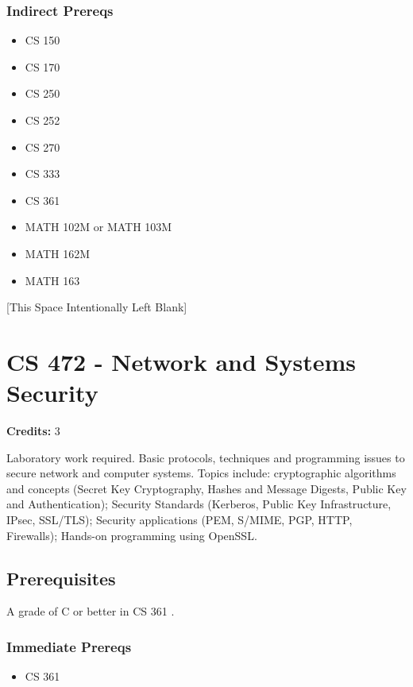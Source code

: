 \documentclass[]{article}
\providecommand{\tightlist}{%
  \setlength{\itemsep}{0pt}\setlength{\parskip}{0pt}}
\newcommand{\pagebreakhere}{
\vspace*{\fill}
\begin{center}
[This Space Intentionally Left Blank]
\end{center}
\vspace*{\fill}
\newpage
}
\begin{document}
\subsubsection{Indirect Prereqs}\label{indirect-prereqs-34}

\begin{itemize}
\tightlist
\item
  CS 150
\item
  CS 170
\item
  CS 250
\item
  CS 252
\item
  CS 270
\item
  CS 333
\item
  CS 361
\item
  MATH 102M or MATH 103M
\item
  MATH 162M
\item
  MATH 163
\end{itemize}

\pagebreakhere
\section{CS 472 - Network and Systems
Security}\label{cs-472---network-and-systems-security}

\textbf{Credits:} 3

Laboratory work required. Basic protocols, techniques and programming
issues to secure network and computer systems. Topics include:
cryptographic algorithms and concepts (Secret Key Cryptography, Hashes
and Message Digests, Public Key and Authentication); Security Standards
(Kerberos, Public Key Infrastructure, IPsec, SSL/TLS); Security
applications (PEM, S/MIME, PGP, HTTP, Firewalls); Hands-on programming
using OpenSSL.

\subsection{Prerequisites}\label{prerequisites-44}

A grade of C or better in CS 361 .

\subsubsection{Immediate Prereqs}\label{immediate-prereqs-35}

\begin{itemize}
\tightlist
\item
  CS 361
\end{itemize}
\end{document}
